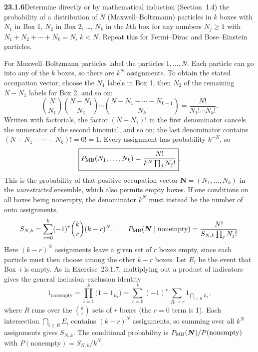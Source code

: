 \par\bigskip
\noindent\textbf{23.1.6}\quad Determine directly or by
mathematical induction (Section~1.4) the probability of a
distribution of $N$ (Maxwell--Boltzmann) particles in $k$ boxes
with $N_{1}$ in Box 1, $N_{2}$ in Box 2, \ldots, $N_{k}$ in the
$k$th box for any numbers $N_{j}\ge1$ with
$N_{1}+N_{2}+\cdots+N_{k}=N$, $k<N$. Repeat this for
Fermi--Dirac and Bose--Einstein particles.
\solution
{}

For Maxwell--Boltzmann particles label the particles $1,\ldots,N$.
Each particle can go into any of the $k$ boxes, so there are $k^N$
assignments. To obtain the stated occupation vector, choose the $N_1$
labels in Box 1, then $N_2$ of the remaining $N-N_1$ labels for Box 2,
and so on:
\[
\binom N{N_1}\binom{N-N_1}{N_2}\cdots
\binom{N-N_1-\cdots-N_{k-1}}{N_k}
=\frac{N!}{N_1!\cdots N_k!}.
\]
Written with factorials, the factor $(N-N_1)!$ in the first denominator
cancels the numerator of the second binomial, and so on; the last
denominator contains $(N-N_1-\cdots-N_k)!=0!=1$.
Every assignment has probability $k^{-N}$, so
\[
\boxed{P_{\rm MB}(N_1,\ldots,N_k)=
\frac{N!}{k^N\prod_jN_j!}}.
\]
This is the probability of that positive occupation vector
$\boldsymbol N=(N_1,\ldots,N_k)$ in the
\emph{unrestricted} ensemble, which also permits empty boxes. If one
conditions on all boxes being nonempty, the denominator $k^N$ must
instead be the number of onto assignments,
\[
S_{N,k}=\sum_{r=0}^k(-1)^r\binom kr(k-r)^N,
\qquad P_{\rm MB}(\boldsymbol N\mid\text{nonempty})
=\frac{N!}{S_{N,k}\prod_jN_j!}.
\]
Here $(k-r)^N$ assignments leave a given set of $r$ boxes empty, since
each particle must then choose among the other $k-r$ boxes. Let $E_i$
be the event that Box~$i$ is empty. As in Exercise~23.1.7, multiplying
out a product of indicators gives the general inclusion--exclusion
identity
\[
1_{\text{nonempty}}=\prod_{i=1}^k\bigl(1-1_{E_i}\bigr)
=\sum_{r=0}^k(-1)^r\sum_{|R|=r}1_{\bigcap_{i\in R}E_i},
\]
where $R$ runs over the $\binom kr$ sets of $r$ boxes (the $r=0$ term
is 1). Each intersection $\bigcap_{i\in R}E_i$ contains $(k-r)^N$
assignments, so summing over all $k^N$ assignments gives $S_{N,k}$.
The conditional probability is
$P_{\rm MB}(\boldsymbol N)/P(\text{nonempty})$ with
$P(\text{nonempty})=S_{N,k}/k^N$.

